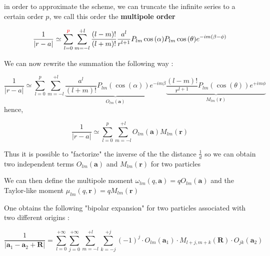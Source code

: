 \documentclass[11pt,twoside,a4paper]{report}
\begin{document}
	in order to approximate the scheme, we can truncate the infinite series to a certain order $p$, we call this order the \textbf{multipole order}
	
	\begin{equation}	
	\frac{1}{|r - a|} \simeq \sum\limits_{l=0}^{\textcolor{red}{p}} \sum\limits_{m = -l}^{+l} \frac{(l-m)!}{(l+m)!} \frac{a^l}{r^{l+1}} P_{lm}\cos{(\alpha)}P_{lm}\cos{(\theta)}e^{-im(\beta - \phi)}
	\label{eq:order}
	\end{equation}
	
	We can now rewrite the summation the following way :
	
		\begin{equation}
	\frac{1}{|r - a|} \simeq \sum\limits_{l=0}^{p} \sum\limits_{m = -l}^{+l}
	\underbrace{\frac{a^l}{(l+m)!} P_{lm}(\cos(\alpha))e^{-im\beta}} _{O_{lm}(\textbf{a})}
    \underbrace{\frac{(l-m)!}{r^{l+1}} P_{lm}(\cos(\theta))e^{+im\phi}} _{M_{lm}(\textbf{r})}
	\end{equation}
	hence,
	
		\begin{equation}
	\frac{1}{|r - a|} \simeq \sum\limits_{l=0}^{p} \sum\limits_{m = -l}^{+l}
	{O_{lm}(\textbf{a})}
    {M_{lm}(\textbf{r})}
	\end{equation}
	
	
	Thus it is possible to "factorize" the inverse of the the distance $\frac{1}{d}$ so we can obtain two independent terms ${O_{lm}(\textbf{a})}$ and ${M_{lm}(\textbf{r})}$  for two particles 


	We can then define the multipole moment $\omega_{lm}(q,\textbf{a}) = q O_{lm}(\textbf{a})$ and the Taylor-like moment $\mu_{lm}(q,\textbf{r}) = q M_{lm}(\textbf{r})$
	
	One obtains the following "bipolar expansion" for two particles associated with two different origins :
	
    \begin{equation}
    \frac{1}{|\textbf{a}_1 - \textbf{a}_2 + \textbf{R}|} = 
    \sum\limits_{l=0}^{+\infty}
    \sum\limits_{j=0}^{+\infty}
    \sum\limits_{m=-l}^{+l}
    \sum\limits_{k=-j}^{+j}
    (-1)^j \cdot O_{lm}(\textbf{a}_1) \cdot M_{l+j,m+k}(\textbf{R}) \cdot O_{jk}(\textbf{a}_2)
    \end{equation}
\end{document}
